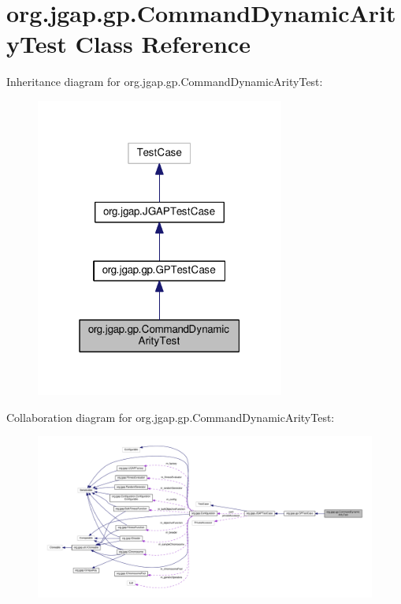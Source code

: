 \hypertarget{classorg_1_1jgap_1_1gp_1_1_command_dynamic_arity_test}{\section{org.\-jgap.\-gp.\-Command\-Dynamic\-Arity\-Test Class Reference}
\label{classorg_1_1jgap_1_1gp_1_1_command_dynamic_arity_test}
}


Inheritance diagram for org.\-jgap.\-gp.\-Command\-Dynamic\-Arity\-Test\-:
\nopagebreak
\begin{figure}[H]
\begin{center}
\leavevmode
\includegraphics[width=232pt]{classorg_1_1jgap_1_1gp_1_1_command_dynamic_arity_test__inherit__graph}
\end{center}
\end{figure}


Collaboration diagram for org.\-jgap.\-gp.\-Command\-Dynamic\-Arity\-Test\-:
\nopagebreak
\begin{figure}[H]
\begin{center}
\leavevmode
\includegraphics[width=350pt]{classorg_1_1jgap_1_1gp_1_1_command_dynamic_arity_test__coll__graph}
\end{center}
\end{figure}
